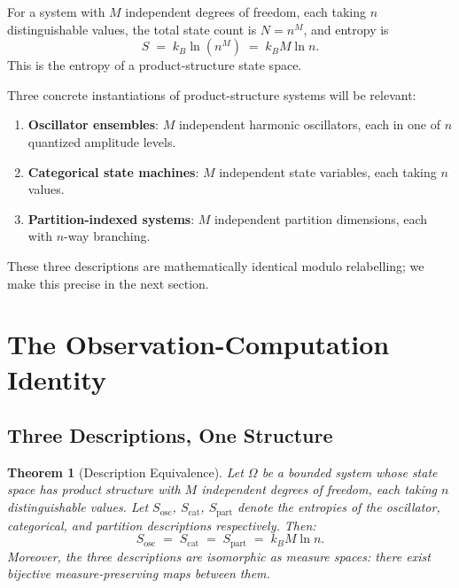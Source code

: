 \documentclass[11pt,twocolumn,a4paper]{article}
\newtheorem{theorem}{Theorem}[section]
\theoremstyle{definition}
\theoremstyle{remark}
\begin{document}
For a system with $M$ independent degrees of freedom, each taking $n$ distinguishable values, the total state count is $N = n^M$, and entropy is
\begin{equation}
\label{eq:product-entropy}
S \;=\; k_B \ln(n^M) \;=\; k_B M \ln n.
\end{equation}
This is the entropy of a product-structure state space.

Three concrete instantiations of product-structure systems will be relevant:
\begin{enumerate}
    \item \textbf{Oscillator ensembles}: $M$ independent harmonic oscillators, each in one of $n$ quantized amplitude levels.
    \item \textbf{Categorical state machines}: $M$ independent state variables, each taking $n$ values.
    \item \textbf{Partition-indexed systems}: $M$ independent partition dimensions, each with $n$-way branching.
\end{enumerate}

These three descriptions are mathematically identical modulo relabelling; we make this precise in the next section.

\section{The Observation-Computation Identity}
\label{sec:identity}

\subsection{Three Descriptions, One Structure}

\begin{theorem}[Description Equivalence]
\label{thm:desc-equiv}
Let $\Omega$ be a bounded system whose state space has product structure with $M$ independent degrees of freedom, each taking $n$ distinguishable values. Let $S_{\text{osc}}$, $S_{\text{cat}}$, $S_{\text{part}}$ denote the entropies of the oscillator, categorical, and partition descriptions respectively. Then:
\[
S_{\text{osc}} \;=\; S_{\text{cat}} \;=\; S_{\text{part}} \;=\; k_B M \ln n.
\]
Moreover, the three descriptions are isomorphic as measure spaces: there exist bijective measure-preserving maps between them.
\end{theorem}
\end{document}
